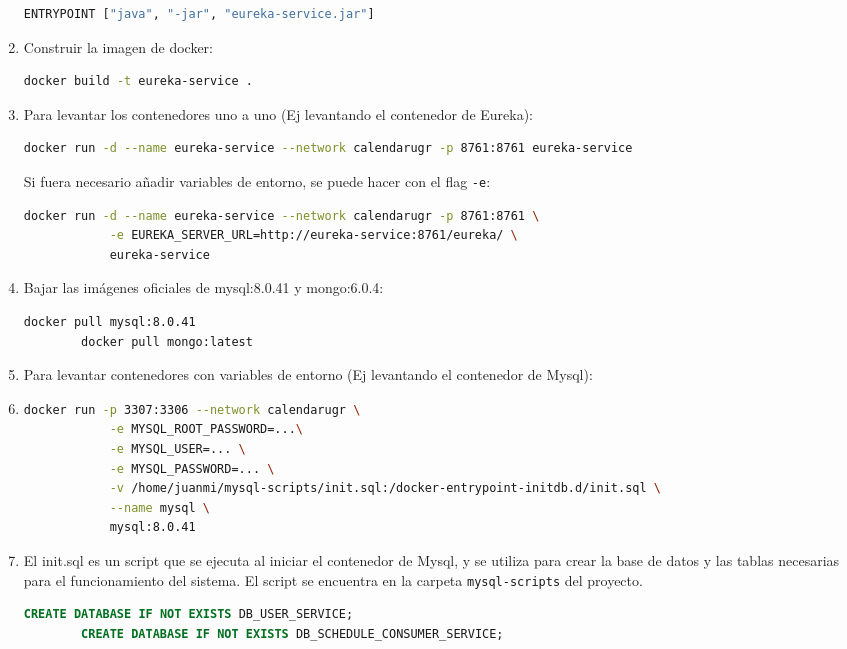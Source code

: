 \begin{enumerate}
\begin{lstlisting}[language=bash]
        ENTRYPOINT ["java", "-jar", "eureka-service.jar"]
    \end{lstlisting}
    \item Construir la imagen de docker:
    \begin{lstlisting}[language=bash]
        docker build -t eureka-service .
    \end{lstlisting}
    \item Para levantar los contenedores uno a uno (Ej levantando el contenedor de Eureka):
    \begin{lstlisting}[language=bash]
        docker run -d --name eureka-service --network calendarugr -p 8761:8761 eureka-service
    \end{lstlisting}
    Si fuera necesario añadir variables de entorno, se puede hacer con el flag \texttt{-e}:
    \begin{lstlisting}[language=bash]
        docker run -d --name eureka-service --network calendarugr -p 8761:8761 \
            -e EUREKA_SERVER_URL=http://eureka-service:8761/eureka/ \
            eureka-service
    \end{lstlisting}
    \item Bajar las imágenes oficiales de mysql:8.0.41 y mongo:6.0.4:
    \begin{lstlisting}[language=bash]
        docker pull mysql:8.0.41
        docker pull mongo:latest
    \end{lstlisting}
    \item Para levantar contenedores con variables de entorno (Ej levantando el contenedor de Mysql):
    \item \begin{lstlisting}[language=bash]
        docker run -p 3307:3306 --network calendarugr \
            -e MYSQL_ROOT_PASSWORD=...\
            -e MYSQL_USER=... \
            -e MYSQL_PASSWORD=... \
            -v /home/juanmi/mysql-scripts/init.sql:/docker-entrypoint-initdb.d/init.sql \
            --name mysql \
            mysql:8.0.41
    \end{lstlisting}
    \item El init.sql es un script que se ejecuta al iniciar el contenedor de Mysql, y se utiliza para crear la base de datos y las tablas necesarias para el funcionamiento del sistema. El script se encuentra en la carpeta \texttt{mysql-scripts} del proyecto.
    \begin{lstlisting}[language=sql]
        CREATE DATABASE IF NOT EXISTS DB_USER_SERVICE;
        CREATE DATABASE IF NOT EXISTS DB_SCHEDULE_CONSUMER_SERVICE;


\end{lstlisting}
\end{enumerate}
